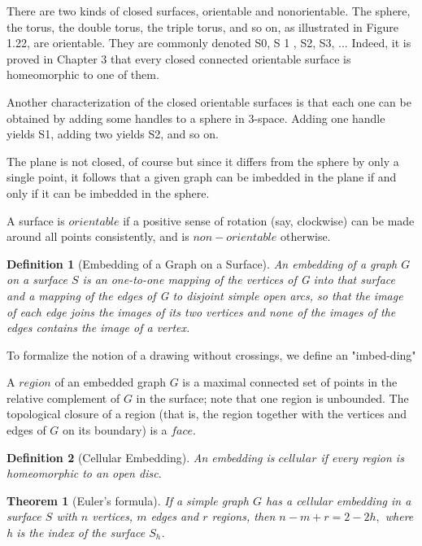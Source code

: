 \documentclass[10pt]{article}
\newtheorem{definition}{Definition}
\newtheorem{theorem}{Theorem}
\begin{document}
There are two kinds of closed surfaces, orientable and nonorientable. The sphere, the torus, the double torus, the triple torus, and so on, as illustrated in Figure 1.22, are orientable. They are commonly denoted S0, S 1 , S2, S3, ... Indeed, it is proved in Chapter 3 that every closed connected orientable surface is homeomorphic to one of them. 

Another characterization of the closed orientable surfaces is that each one can be obtained by adding some handles to a  sphere in 3-space. Adding one handle yields S1, adding two yields S2, and so on.


 The plane is not closed, of course but since it differs from the sphere by only a single point, it follows that a given graph can be imbedded in the plane if and only if it can be imbedded in the sphere. 
 
 

A surface is $orientable$ if a positive sense of rotation (say, clockwise) can be made around all points consistently, and is $non-orientable$ otherwise.

\begin{definition}[Embedding of a Graph on a Surface]
An embedding of a graph $G$ on a surface $S$ is an one-to-one mapping of the vertices of G into that surface and a mapping of the edges of G to disjoint simple open arcs, so that the image of each edge joins the images of its two vertices and none of the images of the edges contains the image of a vertex.
\end{definition}
To formalize the notion of a drawing without crossings, we define an "imbed-ding"

A $region$ of an embedded graph $G$ is a maximal connected set of points in the relative complement of $G$ in the surface; note that one region is unbounded. The topological closure of a region (that is, the region together with the vertices and edges of $G$ on its boundary) is a $face$.

\begin{definition}[Cellular Embedding]
 An embedding is $cellular$ if every region is homeomorphic to an open disc.
\end{definition}

\begin{theorem}[Euler’s formula]
    If a simple graph $G$ has a cellular embedding in a surface $S$ with $n$ vertices, $m$ edges and $r$ regions, then
    $n-m+r=2-2h,$ where h is the index of the surface $S_h$.
\end{theorem}
\end{document}
